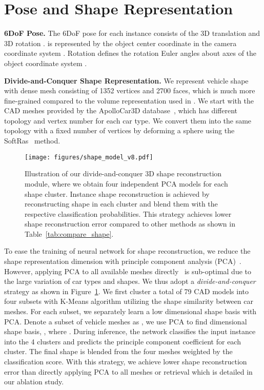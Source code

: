 \documentclass[runningheads]{llncs}
\begin{document}
\section{Pose and Shape Representation}
\label{sec:representation} 
\smallskip\noindent\textbf{6DoF Pose.}
The 6DoF pose for each instance consists of the 3D translation  and 3D rotation .  is represented by the object center coordinate  in the camera coordinate system .
Rotation   defines the rotation Euler angles about  axes of the object coordinate system .

\smallskip\noindent\textbf{Divide-and-Conquer Shape Representation.} 
We represent vehicle shape with dense mesh consisting of 1352 vertices and 2700 faces, which is much more fine-grained compared to the volume representation used in \cite{kundu20183d}. We start with the CAD meshes provided by the ApolloCar3D database~\cite{song2019apollocar3d}, which has different topology and vertex number for each car type. We convert them into the same topology with a fixed number of vertices by deforming a sphere using the SoftRas~\cite{liu2019soft} method.

\begin{figure}[!t]
	\centering
	\texttt{[image: figures/shape\_model\_v8.pdf]}
	\caption{Illustration of our divide-and-conquer 3D shape reconstruction module, where we obtain four independent PCA models for each shape cluster. Instance shape reconstruction is achieved by reconstructing shape in each cluster and blend them with the respective classification probabilities. This strategy achieves lower shape reconstruction error compared to other methods as shown in Table~\ref{tab:compare_shape}.}
	\label{fig:example2}
\end{figure}

To ease the training of neural network for shape reconstruction, we reduce the shape representation dimension with principle component analysis (PCA)~\cite{prisacariu2011nonlinear}. However, applying PCA to all available meshes directly~\cite{engelmann2017samp,leotta2010vehicle,leotta2009predicting} is sub-optimal due to the large variation of car types and shapes. We thus adopt a \textit{divide-and-conquer} strategy as shown in Figure~\ref{fig:example2}. We first cluster a total of 79 CAD models into four subsets with K-Means algorithm utilizing the shape similarity between car meshes. For each subset, we separately learn a low dimensional shape basis with PCA.
Denote a subset of  vehicle meshes as , we use PCA to find  dimensional shape basis, , where .
During inference, the network classifies the input instance into the 4 clusters and predicts the principle component coefficient for each cluster. The final shape is blended from the four meshes weighted by the classification score. With this strategy, we achieve lower shape reconstruction error than directly applying PCA to all meshes or retrieval which is detailed in our ablation study.
\label{sec:pca} 
\end{document}
